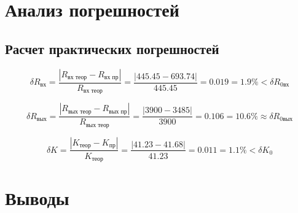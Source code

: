 \section{Анализ погрешностей}

\subsection{Расчет практических погрешностей}
\begin{equation*}
\delta R_\text{вх} = \frac{|R_\text{вх теор} - R_\text{вх пр}|}{R_\text{вх теор}} = \frac{|445.45 - 693.74|}{445.45} = 0.019 = 1.9 \% < \delta R_\text{0вх}
\end{equation*}

\begin{equation*}
\delta R_\text{вых} = \frac{|R_\text{вых теор} - R_\text{вых пр}|}{R_\text{вых теор}} = \frac{|3900 - 3485|}{3900} = 0.106 = 10.6 \% \approx \delta R_\text{0вых}
\end{equation*}

\begin{equation*}
\delta K = \frac{|K_\text{теор} - K_\text{пр}|}{K_\text{теор}} = \frac{|41.23 - 41.68|}{41.23} = 0.011 = 1.1 \% < \delta K_0
\end{equation*}

\section{Выводы}


